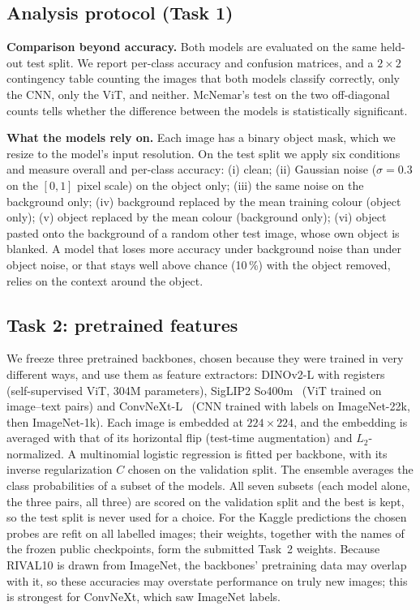 \documentclass[conference]{IEEEtran}
\begin{document}
\subsection{Analysis protocol (Task 1)}
\textbf{Comparison beyond accuracy.} Both models are evaluated on the same held-out test split. We report per-class accuracy and confusion matrices, and a $2\times2$ contingency table counting the images that both models classify correctly, only the CNN, only the ViT, and neither. McNemar's test on the two off-diagonal counts tells whether the difference between the models is statistically significant.

\textbf{What the models rely on.} Each image has a binary object mask, which we resize to the model's input resolution. On the test split we apply six conditions and measure overall and per-class accuracy: (i) clean; (ii) Gaussian noise ($\sigma=0.3$ on the $[0,1]$ pixel scale) on the object only; (iii) the same noise on the background only; (iv) background replaced by the mean training colour (object only); (v) object replaced by the mean colour (background only); (vi) object pasted onto the background of a random other test image, whose own object is blanked. A model that loses more accuracy under background noise than under object noise, or that stays well above chance (10\,\%) with the object removed, relies on the context around the object.

\subsection{Task 2: pretrained features}
We freeze three pretrained backbones, chosen because they were trained in very different ways, and use them as feature extractors: DINOv2-L with registers~\cite{dinov2} (self-supervised ViT, 304M parameters), SigLIP2 So400m~\cite{siglip2} (ViT trained on image--text pairs) and ConvNeXt-L~\cite{convnext} (CNN trained with labels on ImageNet-22k, then ImageNet-1k). Each image is embedded at $224\times224$, and the embedding is averaged with that of its horizontal flip (test-time augmentation) and $L_2$-normalized. A multinomial logistic regression is fitted per backbone, with its inverse regularization $C$ chosen on the validation split. The ensemble averages the class probabilities of a subset of the models. All seven subsets (each model alone, the three pairs, all three) are scored on the validation split and the best is kept, so the test split is never used for a choice. For the Kaggle predictions the chosen probes are refit on all labelled images; their weights, together with the names of the frozen public checkpoints, form the submitted Task~2 weights. Because RIVAL10 is drawn from ImageNet, the backbones' pretraining data may overlap with it, so these accuracies may overstate performance on truly new images; this is strongest for ConvNeXt, which saw ImageNet labels.
\end{document}
